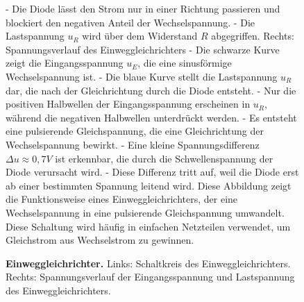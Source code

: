 {\begin{figure}[H]
\begin{minipage}[c]{0.6\textwidth}
{        - Die Diode lässt den Strom nur in einer Richtung passieren und blockiert den negativen Anteil der Wechselspannung.  
        - Die Lastspannung \( u_R \) wird über dem Widerstand \( R \) abgegriffen.  
        Rechts: Spannungsverlauf des Einweggleichrichters 
        - Die schwarze Kurve zeigt die Eingangsspannung \( u_E \), die eine sinusförmige Wechselspannung ist.  
        - Die blaue Kurve stellt die Lastspannung \( u_R \) dar, die nach der Gleichrichtung durch die Diode entsteht.  
        - Nur die positiven Halbwellen der Eingangsspannung erscheinen in \( u_R \), während die negativen Halbwellen unterdrückt werden.  
        - Es entsteht eine pulsierende Gleichspannung, die eine Gleichrichtung der Wechselspannung bewirkt.  
        - Eine kleine Spannungsdifferenz \( \Delta u \approx 0,7V \) ist erkennbar, die durch die Schwellenspannung der Diode verursacht wird.  
        - Diese Differenz tritt auf, weil die Diode erst ab einer bestimmten Spannung leitend wird.  
        Diese Abbildung zeigt die Funktionsweise eines Einweggleichrichters, der eine Wechselspannung in eine pulsierende Gleichspannung umwandelt. Diese Schaltung wird häufig in einfachen Netzteilen verwendet, um Gleichstrom aus Wechselstrom zu gewinnen.}
    \end{minipage}
    \label{fig:Einweggleichrichter}
    \caption{\textbf{Einweggleichrichter.} Links: Schaltkreis des Einweggleichrichters.
        Rechts: Spannungsverlauf der Eingangsspannung und Lastspannung des Einweggleichrichters.}
\end{figure}
}

%
%
%


